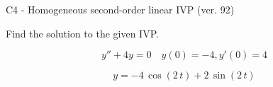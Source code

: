 \begin{exercise}
  \begin{exerciseTitle}C4 - Homogeneous second-order linear IVP (ver. 92)\end{exerciseTitle}
  \begin{exerciseStatement}
    
Find the solution to the given IVP.

    
\[y''+4y = 0 \hspace{1em} y(0) = -4 , y'(0) = 4\]

  \end{exerciseStatement}
  \begin{exerciseAnswer}
    
\[y= -4 \, \cos\left(2 \, t\right) + 2 \, \sin\left(2 \, t\right)\]

  \end{exerciseAnswer}
\end{exercise}